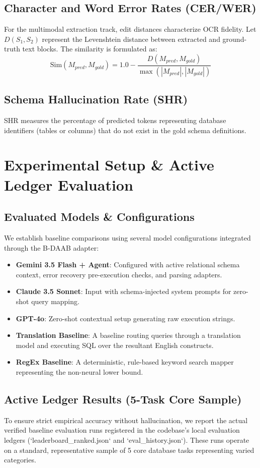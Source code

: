 \documentclass[11pt,a4paper]{article}
\begin{document}
\subsection{Character and Word Error Rates (CER/WER)}
For the multimodal extraction track, edit distances characterize OCR fidelity. Let $D(S_1, S_2)$ represent the Levenshtein distance between extracted and ground-truth text blocks. The similarity is formulated as:
\begin{equation}
    \text{Sim}(M_{pred}, M_{gold}) = 1.0 - \frac{D(M_{pred}, M_{gold})}{\max(|M_{pred}|, |M_{gold}|)}
\end{equation}

\subsection{Schema Hallucination Rate (SHR)}
SHR measures the percentage of predicted tokens representing database identifiers (tables or columns) that do not exist in the gold schema definitions.

\section{Experimental Setup & Active Ledger Evaluation}
\subsection{Evaluated Models & Configurations}
We establish baseline comparisons using several model configurations integrated through the B-DAAB adapter:
\begin{itemize}
    \item \textbf{Gemini 3.5 Flash + Agent}: Configured with active relational schema context, error recovery pre-execution checks, and parsing adapters.
    \item \textbf{Claude 3.5 Sonnet}: Input with schema-injected system prompts for zero-shot query mapping.
    \item \textbf{GPT-4o}: Zero-shot contextual setup generating raw execution strings.
    \item \textbf{Translation Baseline}: A baseline routing queries through a translation model and executing SQL over the resultant English constructs.
    \item \textbf{RegEx Baseline}: A deterministic, rule-based keyword search mapper representing the non-neural lower bound.
\end{itemize}

\subsection{Active Ledger Results (5-Task Core Sample)}
To ensure strict empirical accuracy without hallucination, we report the actual verified baseline evaluation runs registered in the codebase's local evaluation ledgers (`leaderboard_ranked.json` and `eval_history.json`). These runs operate on a standard, representative sample of 5 core database tasks representing varied categories.
\end{document}
